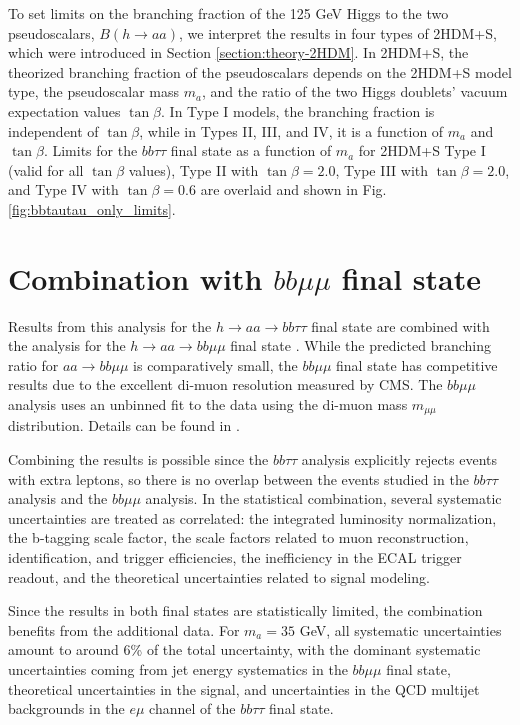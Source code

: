 To set limits on the branching fraction of the 125 GeV Higgs to the two pseudoscalars, $B(h \rightarrow aa)$, we interpret the results in four types of 2HDM+S, which were introduced in Section \ref{section:theory-2HDM}. In 2HDM+S, the theorized branching fraction of the pseudoscalars depends on the 2HDM+S model type, the pseudoscalar mass $m_a$, and the ratio of the two Higgs doublets' vacuum expectation values $\tan\beta$. In Type I models, the branching fraction is independent of $\tan\beta$, while in Types II, III, and IV, it is a function of $m_a$ and $\tan\beta$. Limits for the $bb\tau\tau$ final state as a function of $m_a$ for 2HDM+S Type I (valid for all $\tan\beta$ values), Type II with $\tan\beta = 2.0$, Type III with $\tan\beta = 2.0$, and Type IV with $\tan\beta = 0.6$ are overlaid and shown in Fig. \ref{fig:bbtautau_only_limits}.


\section{Combination with \texorpdfstring{$bb\mu\mu$}{bbmumu} final state}
\label{section:combination-procedure-with-bbmumu}
Results from this analysis for the $h \rightarrow aa \rightarrow bb\tau\tau$ final state are combined with the analysis for the $h \rightarrow aa \rightarrow bb\mu\mu$ final state \cite{CMS-AN-21-058-bbmumu}. While the predicted branching ratio for $aa \rightarrow bb\mu\mu$ is comparatively small, the $bb\mu\mu$ final state has competitive results due to the excellent di-muon resolution measured by CMS. The $bb\mu\mu$ analysis uses an unbinned fit to the data using the di-muon mass $m_{\mu\mu}$ distribution. Details can be found in \cite{CMS-AN-21-058-bbmumu}.

Combining the results is possible since the $bb\tau\tau$ analysis explicitly rejects events with extra leptons, so there is no overlap between the events studied in the $bb\tau\tau$ analysis and the $bb\mu\mu$ analysis. In the statistical combination, several systematic uncertainties are treated as correlated: the integrated luminosity normalization, the b-tagging scale factor, the scale factors related to muon reconstruction, identification, and trigger efficiencies, the inefficiency in the ECAL trigger readout, and the theoretical uncertainties related to signal modeling.

Since the results in both final states are statistically limited, the combination benefits from the additional data. For $m_a = 35$ GeV, all systematic uncertainties amount to around 6\% of the total uncertainty, with the dominant systematic uncertainties coming from jet energy systematics in the $bb\mu\mu$ final state, theoretical uncertainties in the signal, and uncertainties in the QCD multijet backgrounds in the $e\mu$ channel of the $bb\tau\tau$ final state.

